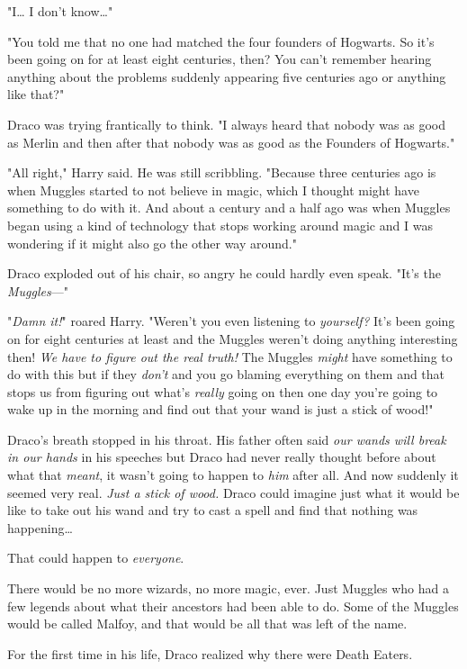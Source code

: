 "I{\ldots} I don't know{\ldots}"

"You told me that no one had matched the four founders of Hogwarts. So it's 
been going on for at least eight centuries, then? You can't remember hearing 
anything about the problems suddenly appearing five centuries ago or anything 
like that?"

Draco was trying frantically to think. "I always heard that nobody was as good 
as Merlin and then after that nobody was as good as the Founders of Hogwarts."

"All right," Harry said. He was still scribbling. "Because three centuries ago 
is when Muggles started to not believe in magic, which I thought might have 
something to do with it. And about a century and a half ago was when Muggles 
began using a kind of technology that stops working around magic and I was 
wondering if it might also go the other way around."

Draco exploded out of his chair, so angry he could hardly even speak. "It's the 
\emph{Muggles}---"

"\emph{Damn it!}" roared Harry. "Weren't you even listening to \emph{yourself?} 
It's been going on for eight centuries at least and the Muggles weren't doing 
anything interesting then! \emph{We have to figure out the real truth!} The 
Muggles \emph{might} have something to do with this but if they \emph{don't} 
and you go blaming everything on them and that stops us from figuring out 
what's \emph{really} going on then one day you're going to wake up in the 
morning and find out that your wand is just a stick of wood!"

Draco's breath stopped in his throat. His father often said \emph{our wands 
will break in our hands} in his speeches but Draco had never really thought 
before about what that \emph{meant}, it wasn't going to happen to \emph{him} 
after all. And now suddenly it seemed very real. \emph{Just a stick of wood.} 
Draco could imagine just what it would be like to take out his wand and try to 
cast a spell and find that nothing was happening{\ldots}

That could happen to \emph{everyone}.

There would be no more wizards, no more magic, ever. Just Muggles who had a few 
legends about what their ancestors had been able to do. Some of the Muggles 
would be called Malfoy, and that would be all that was left of the name.

For the first time in his life, Draco realized why there were Death Eaters.

